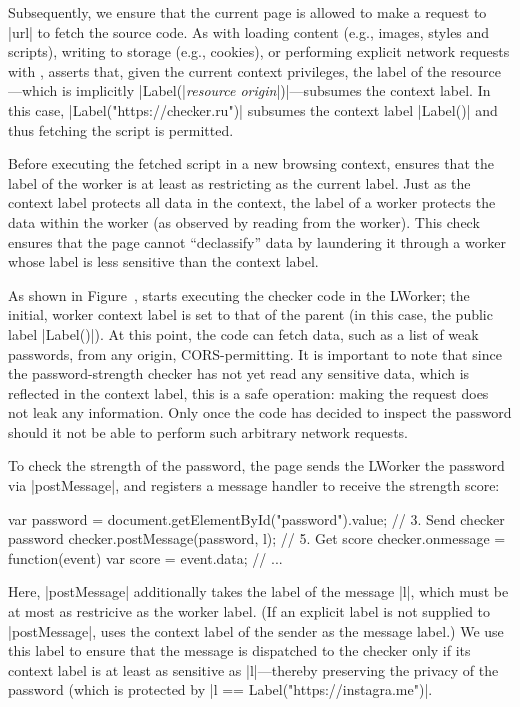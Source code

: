 Subsequently, we ensure that the current page is allowed to make a
request to \js|url| to fetch the source code.
%
As with loading content (e.g., images, styles and scripts), writing to
storage (e.g., cookies), or performing explicit network requests with
\xhr{}, \sys{} asserts that, given the current context privileges, the
label of the resource---which is implicitly \js|Label(|\emph{resource
origin}\js|)|---subsumes the context label.
%
In this case, \js|Label("https://checker.ru")| subsumes the context
label \js|Label()| and thus fetching the script is permitted.

Before executing the fetched script in a new browsing context, \sys{}
ensures that the label of the worker is at least as restricting as the
current label.
%
Just as the context label protects all data in the context, the label
of a worker protects the data within the worker (as observed by
reading from the worker).
%
This check ensures that the page cannot ``declassify'' data by
laundering it through a worker whose label is less sensitive than the
context label.

As shown in Figure~, \sys{} starts executing the
checker code in the LWorker; the initial, worker context label is set
to that of the parent (in this case, the public label \js|Label()|).
%
At this point, the code can fetch data, such as a list of weak
passwords, from any origin, CORS-permitting.
%
It is important to note that since the password-strength checker has
not yet read any sensitive data, which is reflected in the context
label, this is a safe operation: making the request does not leak any
information.
%
Only once the code has decided to inspect the password should it not
be able to perform such arbitrary network requests.

To check the strength of the password, the page sends the LWorker the
password via \js|postMessage|, and registers a message handler to
receive the strength score:
\begin{jscode}
var password = 
 document.getElementById("password").value;
// 3. Send checker password 
checker.postMessage(password, l);
// 5. Get score
checker.onmessage = function(event) {
  var score = event.data; 
  // ...
}
\end{jscode}
Here, \js|postMessage| additionally takes the label of the message
\js|l|, which must be at most as restricive as the worker label.
%
(If an explicit label is not supplied to \js|postMessage|, \sys{}
uses the context label of the sender as the message label.)
%
We use this label to ensure that the message is dispatched to the
checker only if its context label is at least as sensitive as
\js|l|---thereby preserving the privacy of the password (which is
protected by \js|l == Label("https://instagra.me")|.

